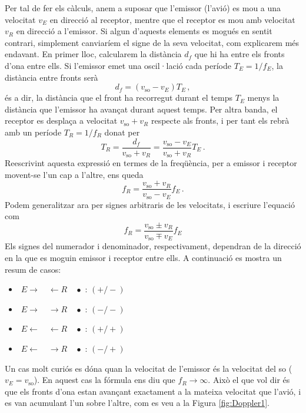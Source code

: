 \documentclass[12pt]{book}
\begin{document}
%
Per tal de fer els càlculs, anem a suposar que l'emissor (l'avió) es mou a una velocitat $v_E$ en direcció al receptor, mentre que el receptor es mou amb velocitat $v_R$ en direcció a l'emissor. Si algun d'aquests elements es mogués en sentit contrari, simplement canviaríem el signe de la seva velocitat, com explicarem més endavant. En primer lloc, calcularem la distància $d_f$ que hi ha entre els fronts d'ona entre ells. Si l'emissor emet una oscil·lació cada període $T_E = 1/f_E$, la distància entre fronts serà
%
\begin{equation}
    d_f = (v_\text{so} - v_E) T_E\, , 
\end{equation}
%
és a dir, la distància que el front ha recorregut durant el temps $T_E$ menys la distància que l'emissor ha avançat durant aquest temps. Per altra banda, el receptor es desplaça a velocitat $v_\text{so} + v_R$ respecte als fronts, i per tant els rebrà amb un període $T_R = 1/f_R$ donat per
%
\begin{equation}
    T_R = \frac{d_f}{v_\text{so} + v_R} = \frac{v_\text{so} - v_E}{v_\text{so} + v_R} T_E\, .
\end{equation}
%
Reescrivint aquesta expressió en termes de la freqüència, per a emissor i receptor movent-se l'un cap a l'altre, ens queda
%
\begin{equation}
    f_R = \frac{v_\text{so} + v_R}{v_\text{so} - v_E} f_E\, .
\end{equation}
%
Podem generalitzar ara per signes arbitraris de les velocitats, i escriure l'equació com 
%
\begin{equation}
    \boxed{f_R = \frac{v_\text{so} \pm v_R}{v_\text{so} \mp v_E} f_E}
\end{equation}
%
Els signes del numerador i denominador, respectivament, dependran de la direcció en la que es moguin emissor i receptor entre ells. A continuació es mostra un resum de casos:
%
\begin{itemize}
    \centering
    \item $\; E \longrightarrow \quad \longleftarrow R \quad \bullet$ : $(+/-)$
    \item $\; E \longrightarrow \quad \longrightarrow R \quad \bullet$ : $(-/-)$
    \item $\; E \longleftarrow \quad \longleftarrow R \quad \bullet$ : $(+/+)$
    \item $\; E \longleftarrow \quad \longrightarrow R \quad \bullet$ : $(-/+)$
\end{itemize}
%
Un cas molt curiós es dóna quan la velocitat de l'emissor és la velocitat del so ($v_E = v_\text{so}$). En aquest cas la fórmula ens diu que $f_R \to \infty$. Això el que vol dir és que els fronts d'ona estan avançant exactament a la mateixa velocitat que l'avió, i es van acumulant l'un sobre l'altre, com es veu a la Figura \ref{fig:Doppler1}. 
\end{document}
